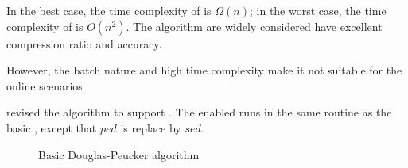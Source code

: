 In the best case, the time complexity of \dpa is $\Omega(n)$; in the worst case, the time complexity of \dpa is $O(n^2)$.
The \dpa algorithm are \textcolor[rgb]{0.00,0.07,1.00}{widely considered have excellent compression ratio and accuracy.}

However, the batch nature and high time complexity make it not suitable for the online scenarios.

\cite{Meratnia:Spatiotemporal} revised the \dpa algorithm to support \sed.
The \sed enabled \dpa runs in the same routine as the basic \dpa, except that $ped$ is replace by $sed$.

\begin{figure}[tb!]
\begin{center}
{\small
\begin{minipage}{3.36in}
\myhrule \vspace{-1ex}
\vspace{-2.5ex}
\myhrule
\end{minipage}
}
\end{center}
\vspace{-3ex}
\caption{\small Basic Douglas-Peucker algorithm}
\label{alg:dp}
\vspace{-2ex}
\end{figure}


